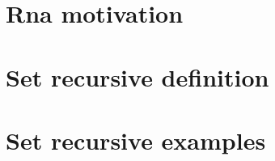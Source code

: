 
\section*{Rna motivation}

\vfill
\section*{Set recursive definition}

\vfill
\section*{Set recursive examples}

\vfill
